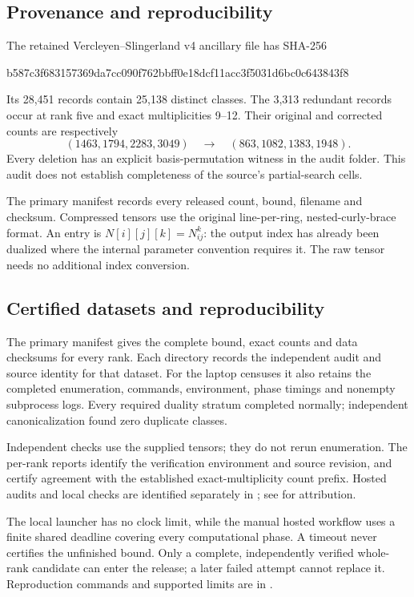 \documentclass[11pt,a4paper]{article}
\theoremstyle{definition}\newtheorem{definition}[theorem]{Definition}\newtheorem{remark}[theorem]{Remark}
\begin{document}
\subsection{Provenance and reproducibility}
The retained Vercleyen--Slingerland v4 ancillary file has SHA-256
\begin{center}\footnotesize\ttfamily
b587c3f683157369da7cc090f762bbff0e18dcf11acc3f5031d6bc0c643843f8
\end{center}
Its 28,451 records contain 25,138 distinct classes. The 3,313 redundant records
occur at rank five and exact multiplicities 9--12. Their original and corrected
counts are respectively
\[
(1463,1794,2283,3049)\quad\longrightarrow\quad(863,1082,1383,1948).
\]
Every deletion has an explicit basis-permutation witness in the audit folder.
This audit does not establish completeness of the source's partial-search cells.

The primary manifest  records every released count,
bound, filename and checksum. Compressed tensors use the original line-per-ring,
nested-curly-brace format. An entry is $N[i][j][k]=N_{ij}^{k}$: the output index
has already been dualized where the internal parameter convention requires it.
The raw tensor needs no additional index conversion.

\subsection{Certified datasets and reproducibility}
The primary manifest gives the complete bound, exact counts and data checksums
for every rank. Each  directory records the independent
audit and source identity for that dataset. For the laptop censuses it also
retains the completed enumeration, commands, environment, phase timings and
nonempty subprocess logs. Every required duality stratum completed normally;
independent canonicalization found zero duplicate classes.

Independent checks use the supplied tensors; they do not rerun enumeration.
The per-rank reports identify the verification environment and source revision,
and certify agreement with the established exact-multiplicity count prefix.
Hosted audits and local checks are identified separately in
; see  for attribution.

The local launcher has no clock limit, while the manual hosted workflow uses a
finite shared deadline covering every computational phase. A timeout never
certifies the unfinished bound. Only a complete, independently verified whole-rank
candidate can enter the release; a later failed attempt cannot replace it.
Reproduction commands and supported limits are in .
\end{document}
